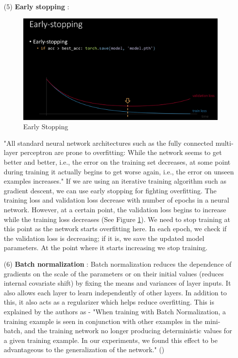 \begin{itemize}
    \item[(5)] \textbf{Early stopping} :  
    \begin{figure}
        \centering
        \includegraphics[scale=0.23]{labs/08/images/Early_Stopping.png}
        \caption{Early Stopping}
        \label{fig:Early Stopping}
    \end{figure}
    "All standard neural network architectures such as the fully connected multi-layer perceptron are prone to
    overfitting: While the network seems to get better and better, i.e., the error on the training set decreases, at some point during training it actually begins to get worse again, i.e., the error on unseen examples increases."\cite{early_stopping} 
    If we are using an iterative training algorithm such as gradient descent, we can use early stopping for fighting overfitting.
    The training loss and validation loss decrease with number of epochs in a neural network. 
    However, at a certain point, the validation loss begins to increase while the training loss decreases (See Figure \ref{fig:Early Stopping}).
    We need to stop training at this point as the network starts overfitting here. 
    In each epoch, we check if the validation loss is decreasing; if it is, we save the updated model parameters. 
    At the point where it starts increasing we stop training.

    \item[(6)] \textbf{Batch normalization} : Batch normalization reduces the dependence of gradients on the scale of the parameters or on their initial values (reduces internal covariate shift) by fixing the means and variances of layer inputs.
    It also allows each layer to learn independently of other layers. 
    In addition to this, it also acts as a regularizer which helps reduce overfitting.
    This is explained by the authors as - 
    "When training with Batch Normalization, a training example is seen in conjunction with other examples in the mini-batch, and the training network no longer producing deterministic values for a given training example. 
    In our experiments, we found this effect to be advantageous to the generalization of the network." (\cite{DBLP:journals/corr/IoffeS15})
    

\end{itemize}

